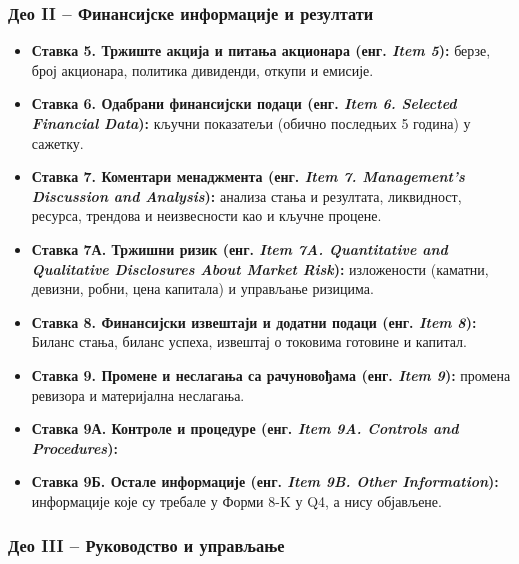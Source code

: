 \subsubsection{Део II – Финансијске информације и резултати}

\begin{itemize}
\item \textbf{Ставка 5. Тржиште акција и питања акционара (енг. \textit{Item 5}):} берзе, број акционара, политика дивиденди, откупи и емисије.

\item \textbf{Ставка 6. Одабрани финансијски подаци (енг. \textit{Item 6. Selected Financial Data}):} кључни показатељи (обично последњих 5 година) у сажетку.

\item \textbf{Ставка 7. Коментари менаджмента (енг. \textit{Item 7. Management's Discussion and Analysis}):} анализа стања и резултата, ликвидност, ресурса, трендова и неизвесности као и кључне процене.

\item \textbf{Ставка 7А. Тржишни ризик (енг. \textit{Item 7A. Quantitative and Qualitative Disclosures About Market Risk}):} изложености (каматни, девизни, робни, цена капитала) и управљање ризицима.

\item \textbf{Ставка 8. Финансијски извештаји и додатни подаци (енг. \textit{Item 8}):} Биланс стања, биланс успеха, извештај о токовима готовине и капитал.

\item \textbf{Ставка 9. Промене и неслагања са рачуновођама (енг. \textit{Item 9}):} промена ревизора и материјална неслагања.

\item \textbf{Ставка 9А. Контроле и процедуре (енг. \textit{Item 9A. Controls and Procedures}):}

\item \textbf{Ставка 9Б. Остале информације (енг. \textit{Item 9B. Other Information}):} информације које су требале у Форми 8-K у Q4, а нису објављене.
\end{itemize}

\subsubsection{Део III – Руководство и управљање}

